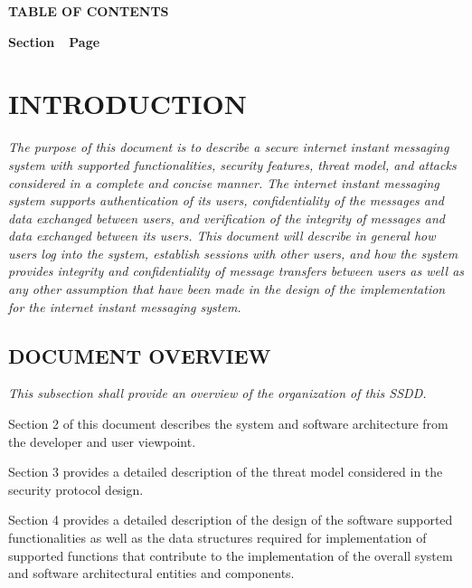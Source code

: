 \documentclass[twoside,letterpaper]{article}
\begin{document}
{\centering{}\bfseries\color{black}
TABLE OF CONTENTS
\par}

{\bfseries\color{black}
Section\ \ Page}

\setcounter{tocdepth}{9}
\renewcommand\contentsname{}
\tableofcontents

\bigskip

\bigskip
\clearpage\setcounter{page}{1}\pagestyle{Convertiv}
\section[INTRODUCTION]{\bfseries\color{black}
INTRODUCTION}
{\itshape\color{black}
The purpose of this document is to describe a secure internet instant 
messaging system with supported functionalities, security features, 
threat model, and attacks considered in a complete and concise manner. 
The internet instant messaging system supports authentication of its users, 
confidentiality of the messages and data exchanged between users, and 
verification of the integrity of messages and data exchanged between its users. 
This document will describe in general how users log into the system, establish
 sessions with other users, and how the system provides integrity and confidentiality 
 of message transfers between users as well as any other assumption that 
 have been made in the design of the implementation for the internet instant 
 messaging system.
}

\bigskip

\subsection{DOCUMENT OVERVIEW}
{\itshape\color{black}
This subsection shall provide an overview of the organization of this
SSDD.}

{\color{black}
Section 2 of this document describes the system and software
architecture from the developer and user viewpoint. \ }

{\color{black}
Section 3 provides a detailed description of the threat model considered 
in the security protocol design. \ }

{\color{black}
Section 4 provides a detailed description of the design of the software supported
functionalities as well as the data structures required for implementation
of supported functions that contribute to the implementation of the overall
system and software architectural entities and components.  \ }
\end{document}
